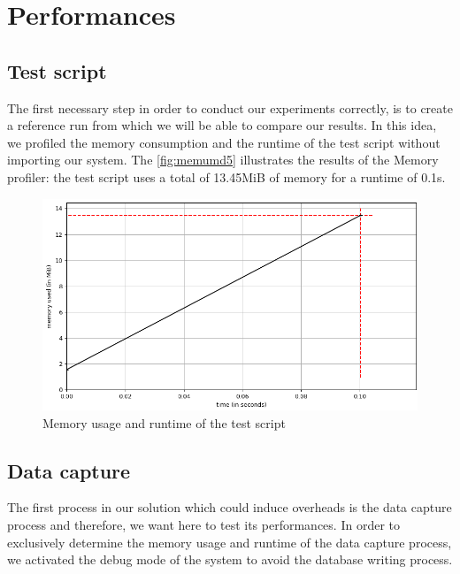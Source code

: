 \section{Performances}
\subsection{Test script}
The first necessary step in order to conduct our experiments correctly, is to create a reference run from which we will be able to compare our results.
In this idea, we profiled the memory consumption and the runtime of the test script without importing our system. The \autoref{fig:memumd5} illustrates the results of the Memory profiler: the test script uses a total of 13.45MiB of memory for a runtime of 0.1s.
\begin{figure}[h!]
  \centering
    \includegraphics[width=\textwidth]{figures/experiments_figure_md5.png}
    \caption{Memory usage and runtime of the test script}
    \label{fig:memumd5}
\end{figure}
\subsection{Data capture}
The first process in our solution which could induce overheads is the data capture process and therefore, we want here to test its performances. In order to exclusively determine the memory usage and runtime of the data capture process, we activated the debug mode of the system to avoid the database writing process. 

